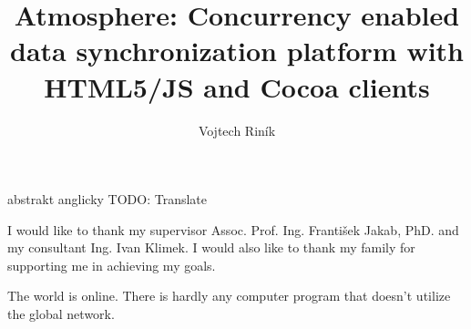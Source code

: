 \documentclass[]{tukethesis}
\author{Vojtech Riník}
\title{Atmosphere: Concurrency enabled data synchronization platform with HTML5/JS and Cocoa clients}
\subtitle{}
\begin{document}
\renewcommand\theHfigure{\theHsection.\arabic{figure}}
\renewcommand\theHtable{\theHsection.\arabic{table}}

\firstpage

\titlepage


% 
% 

\abstrakte %
abstrakt anglicky
\abstrakt %
TODO: Translate
\endabstract %

\assignthesis

\declaration

\acknowledgement %
I would like to thank my supervisor Assoc. Prof. Ing. František Jakab, PhD. and my consultant Ing. Ivan Klimek. I would also like to thank my family for supporting me in achieving my goals.
\endacknowledgement

\preface %
The world is online. There is hardly any computer program that doesn’t utilize the global network. 
\end{document}
